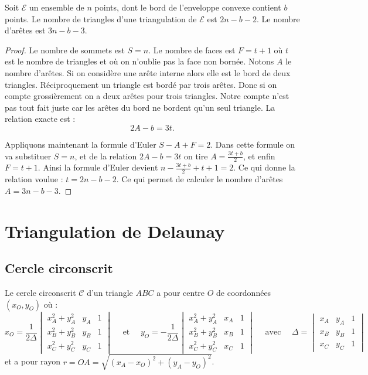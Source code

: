 \documentclass[11pt,class=report,crop=false]{standalone}
\begin{document}
\begin{proposition}
	Soit $\mathcal{E}$ un ensemble de $n$ points, dont le bord de l'enveloppe convexe contient $b$ points.
	Le nombre de triangles d'une triangulation de $\mathcal{E}$ est $2n-b-2$.
	Le nombre d'arêtes est $3n-b-3$.
\end{proposition}	

\begin{proof}
Le nombre de sommets est $S = n$.
Le nombre de faces est $F = t+1$ où $t$ est le nombre de triangles et où on n'oublie pas la face non bornée.
Notons $A$ le nombre d'arêtes.
Si on considère une arête interne alors elle est le bord de deux triangles.
Réciproquement un triangle est bordé par trois arêtes. Donc si on compte grossièrement on a deux arêtes pour trois triangles. Notre compte n'est pas tout fait juste car les arêtes du bord ne bordent qu'un seul triangle. La relation exacte est :
$$2A -b = 3t.$$


Appliquons maintenant la formule d'Euler $S-A+F=2$.
Dans cette formule on va substituer $S=n$,
et de la relation $2A-b=3t$ on tire $A=\frac{3t+b}{2}$, et enfin $F=t+1$.
Ainsi la formule d'Euler devient
$n-\frac{3t+b}{2} + t+1 = 2$. Ce qui donne la relation voulue : $t = 2n-b-2$.
Ce qui permet de calculer le nombre d'arêtes $A = 3n-b-3$.
\end{proof}


\section{Triangulation de Delaunay}


\subsection{Cercle circonscrit}

\begin{proposition}

Le cercle circonscrit $\mathcal{C}$ d'un triangle $ABC$ a pour centre
$O$ de coordonnées $(x_O,y_O)$ où :
$$x_O = \frac{1}{2\Delta}\begin{vmatrix}x_A^2+y_A^2 & y_A & 1 \\ x_B^2+y_B^2 & y_B & 1 \\ x_C^2+y_C^2 & y_C & 1 \end{vmatrix}
\quad \text{ et } \quad 
y_O = -\frac{1}{2\Delta}\begin{vmatrix}x_A^2+y_A^2 & x_A & 1 \\ x_B^2+y_B^2 & x_B & 1 \\ x_C^2+y_C^2 & x_C & 1 \end{vmatrix}
\quad \text{ avec } \quad
\Delta= \begin{vmatrix}x_A & y_A & 1 \\ x_B & y_B & 1 \\ x_C & y_C & 1 \end{vmatrix}
$$
et a pour rayon 
$r = OA = \sqrt{ (x_A-x_O)^2 + (y_A-y_O)^2 }$.
\end{proposition}	
\end{document}
